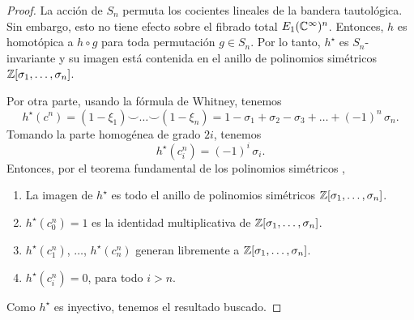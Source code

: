 \begin{proof}
La acción de $S_n$ permuta los cocientes lineales de la bandera tautológica. Sin embargo, esto no tiene efecto sobre el fibrado total $E_1(\mathbb C^\infty)^n$. Entonces, $h$ es homotópica a $h \circ g$ para toda permutación $g \in S_n$. Por lo tanto, $h^\star$ es $S_n$-invariante y su imagen está contenida en el anillo de polinomios simétricos $\mathbb Z[\sigma_1, \dots, \sigma_n]$.

Por otra parte, usando la fórmula de Whitney, tenemos
$$h^\star(c^n) = (1 - \xi_1) \smile \dots \smile (1 - \xi_n) = 1 - \sigma_1 + \sigma_2 - \sigma_3 + \dots + (-1)^n \, \sigma_n.$$
Tomando la parte homogénea de grado $2i$, tenemos
$$h^\star(c_i^n) = (-1)^i \, \sigma_i.$$
Entonces, por el teorema fundamental de los polinomios simétricos \cite[pp. 347-348]{cox},
\begin{enumerate}[label=\alph*)]
    \itemsep 0em
    \item La imagen de $h^\star$ es todo el anillo de polinomios simétricos $\mathbb Z[\sigma_1, \dots, \sigma_n]$.
    \item $h^\star(c_0^n) = 1$ es la identidad multiplicativa de $\mathbb Z[\sigma_1, \dots, \sigma_n]$.
    \item $h^\star(c_1^n)$, $\dots$, $h^\star(c_n^n)$ generan libremente a $\mathbb Z[\sigma_1, \dots, \sigma_n]$.
    \item $h^\star(c_i^n) = 0$, para todo $i > n$.
\end{enumerate}
Como $h^\star$ es inyectivo, tenemos el resultado buscado.
\end{proof}
